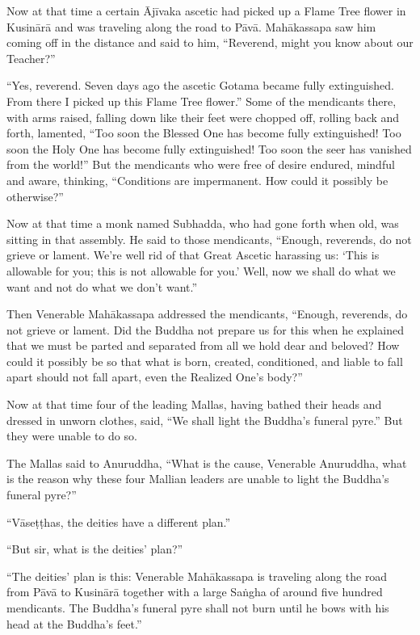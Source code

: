 \documentclass[12pt,openany]{book}%
\begin{document}
Now at that time a certain \textsanskrit{Ājīvaka} ascetic had picked up a Flame Tree flower in \textsanskrit{Kusinārā} and was traveling along the road to \textsanskrit{Pāvā}. \textsanskrit{Mahākassapa} saw him coming off in the distance and said to him, “Reverend, might you know about our Teacher?” 

“Yes, reverend. Seven days ago the ascetic Gotama became fully extinguished. From there I picked up this Flame Tree flower.” Some of the mendicants there, with arms raised, falling down like their feet were chopped off, rolling back and forth, lamented, “Too soon the Blessed One has become fully extinguished! Too soon the Holy One has become fully extinguished! Too soon the seer has vanished from the world!” But the mendicants who were free of desire endured, mindful and aware, thinking, “Conditions are impermanent. How could it possibly be otherwise?” 

Now at that time a monk named Subhadda, who had gone forth when old, was sitting in that assembly. He said to those mendicants, “Enough, reverends, do not grieve or lament. We’re well rid of that Great Ascetic harassing us: ‘This is allowable for you; this is not allowable for you.’ Well, now we shall do what we want and not do what we don’t want.” 

Then Venerable \textsanskrit{Mahākassapa} addressed the mendicants, “Enough, reverends, do not grieve or lament. Did the Buddha not prepare us for this when he explained that we must be parted and separated from all we hold dear and beloved? How could it possibly be so that what is born, created, conditioned, and liable to fall apart should not fall apart, even the Realized One’s body?” 

Now at that time four of the leading Mallas, having bathed their heads and dressed in unworn clothes, said, “We shall light the Buddha’s funeral pyre.” But they were unable to do so. 

The Mallas said to Anuruddha, “What is the cause, Venerable Anuruddha, what is the reason why these four Mallian leaders are unable to light the Buddha’s funeral pyre?” 

“\textsanskrit{Vāseṭṭhas}, the deities have a different plan.” 

“But sir, what is the deities’ plan?” 

“The deities’ plan is this: Venerable \textsanskrit{Mahākassapa} is traveling along the road from \textsanskrit{Pāvā} to \textsanskrit{Kusinārā} together with a large \textsanskrit{Saṅgha} of around five hundred mendicants. The Buddha’s funeral pyre shall not burn until he bows with his head at the Buddha’s feet.” 
\end{document}
